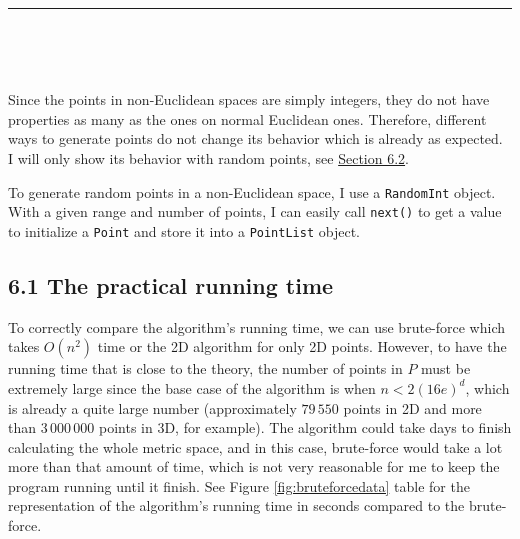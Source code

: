 \documentclass[12pt,english,]{article}
\newcommand{\code}[1]{\colorbox{light-gray}{\texttt{#1}}}
\let\origfigure\figure
\let\endorigfigure\endfigure
\renewenvironment{figure}[1][2] {
    \expandafter\origfigure\expandafter[H]
} {
    \endorigfigure
}
\begin{document}
\vspace{-2truemm}
\begin{figure}[!h]
\centering
{}

\caption{An example of points in a grid on a Euclidean space. A set of 40 points that gives us a $4\times10$ grid. Points are placed at corners of the squares whose sides are equal to $d$ that could be any number.}
\label{fig:grid}
\end{figure}

\hrule

~

~

Since the points in non-Euclidean spaces are simply integers, they do
not have properties as many as the ones on normal Euclidean ones.
Therefore, different ways to generate points do not change its behavior
which is already as expected. I will only show its behavior with random
points, see \protect\hyperlink{section6.2}{Section 6.2}.

To generate random points in a non-Euclidean space, I use a
\code{RandomInt} object. With a given range and number of points, I can
easily call \code{next()} to get a value to initialize a \code{Point}
and store it into a \code{PointList} object.

\hypertarget{the-practical-running-time}{%
\subsection{6.1 The practical running
time}\label{the-practical-running-time}}

To correctly compare the algorithm's running time, we can use
brute-force which takes \(O(n^2)\) time or the 2D algorithm for only 2D
points. However, to have the running time that is close to the theory,
the number of points in \(P\) must be extremely large since the base
case of the algorithm is when \(n < 2(16e)^d\), which is already a quite
large number (approximately \(79\,550\) points in 2D and more than
\(3\,000\,000\) points in 3D, for example). The algorithm could take
days to finish calculating the whole metric space, and in this case,
brute-force would take a lot more than that amount of time, which is not
very reasonable for me to keep the program running until it finish. See
Figure \ref{fig:bruteforcedata} table for the representation of the
algorithm's running time in seconds compared to the brute-force.
\end{document}
